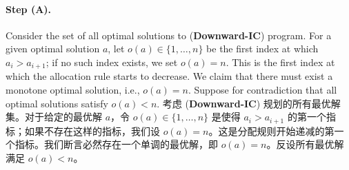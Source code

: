 \documentclass[12pt,letterpaper]{article}
\newenvironment{original}{\color{black}\noindent}{}
\newenvironment{translation}{\color{blue}\noindent}{}
\theoremstyle{plain}
\theoremstyle{definition}
\theoremstyle{remark}
\renewcommand{\1}{\mathds{1}}
\theoremstyle{definition}
\begin{document}
\paragraph{Step (A).}\hspace{-2mm}\begin{original}Consider the set of all optimal solutions to (\textbf{Downward-IC}) program. For a given optimal solution $a$, let $o(a) \in \{1, \dots, n\}$ be the first index at which $a_i > a_{i+1}$; if no such index exists, we set $o(a) = n$. This is the first index at which the allocation rule starts to decrease. We claim that there must exist a monotone optimal solution, i.e., $o(a) = n$. Suppose for contradiction that all optimal solutions satisfy $o(a) < n$.
\end{original}
\begin{translation}
考虑 (\textbf{Downward-IC}) 规划的所有最优解集。对于给定的最优解 $a$，令 $o(a) \in \{1, \dots, n\}$ 是使得 $a_i > a_{i+1}$ 的第一个指标；如果不存在这样的指标，我们设 $o(a) = n$。这是分配规则开始递减的第一个指标。我们断言必然存在一个单调的最优解，即 $o(a) = n$。反设所有最优解满足 $o(a) < n$。
\end{translation}
\end{document}
